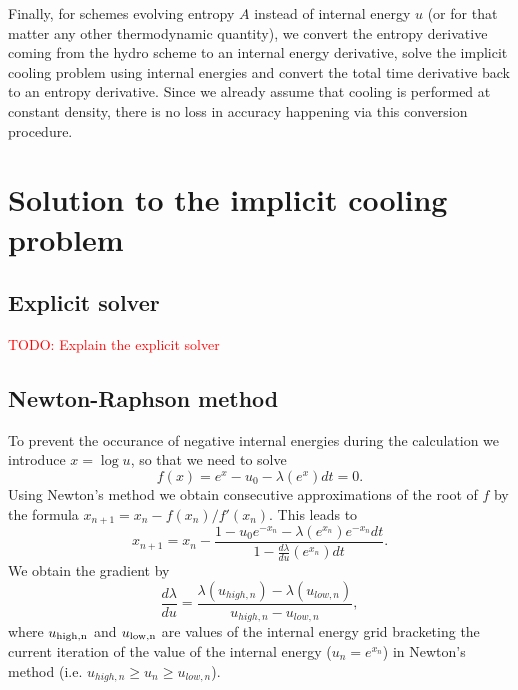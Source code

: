 \documentclass[fleqn, usenatbib, useAMS, a4paper]{mnras}
\newcommand{\todo}[1]{{\textcolor{red}{TODO: #1}\\}}
\newcommand{\D}[2]{\frac{d#1}{d#2}}
\begin{document}
Finally, for schemes evolving entropy $A$ instead of internal energy
$u$ (or for that matter any other thermodynamic quantity), we convert
the entropy derivative coming from the hydro scheme to an internal
energy derivative, solve the implicit cooling problem using internal
energies and convert the total time derivative back to an entropy
derivative. Since we already assume that cooling is performed at
constant density, there is no loss in accuracy happening via this
conversion procedure.

\section{Solution to the implicit cooling problem}

\subsection{Explicit solver}

\todo{Explain the explicit solver}

\subsection{Newton-Raphson method}

To prevent the occurance of negative internal energies during the
calculation we introduce $x = \log u$, so that we need to solve
\begin{equation}\label{fx-eq}
f(x) = e^x - u_0 - \lambda(e^x) dt = 0.
\end{equation}
Using Newton's method we obtain consecutive approximations of the root
of $f$ by the formula $x_{n+1} = x_n - f(x_n)/f'(x_n)$. This leads to
\begin{equation}
x_{n+1} = x_n - \frac{1 - u_0 e^{-x_n} -\lambda(e^{x_n})e^{-x_n}dt}{1
  - \frac{d\lambda}{du}(e^{x_n}) dt}.
\end{equation}
We obtain the gradient by
\begin{equation}
  \D \lambda u = \frac{\lambda(u_{high,n})
    - \lambda(u_{low,n})}{u_{high,n} - u_{low,n}},
\end{equation}
where $u_{\rm high,n}$ and $ u_{\rm low,n}$ are values of the internal
energy grid bracketing the current iteration of the value of the
internal energy ($u_n = e^{x_n}$) in Newton's method (i.e. $u_{high,n}
\ge u_n \ge u_{low,n}$).

\end{document}
